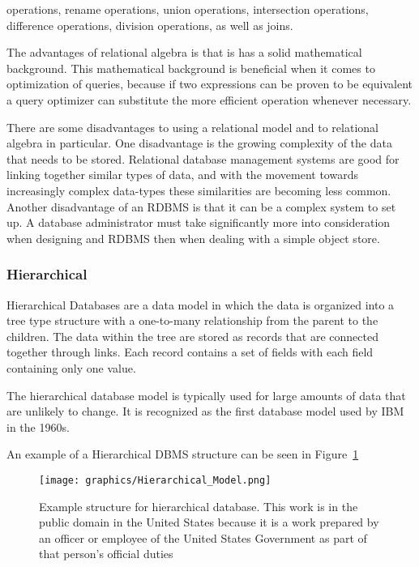 \documentclass[letterpaper, 12pt]{article}
\begin{document}
operations, rename operations, union operations, intersection operations, difference
operations, division operations, as well as joins.
\par\vspace{\baselineskip}
The advantages of relational algebra is that is has a solid mathematical background.
This mathematical background is beneficial when it comes to optimization of queries,
because if two expressions can be proven to be equivalent a query optimizer can
substitute the more efficient operation whenever necessary.
\par\vspace{\baselineskip}
There are some disadvantages to using a relational model and to relational algebra in
particular. One disadvantage is the growing complexity of the data that needs to be
stored. Relational database management systems are good for linking together similar types
of data, and with the movement towards increasingly complex data-types these similarities
are becoming less common. Another disadvantage of an RDBMS is that it can be a complex
system to set up. A database administrator must take significantly more into consideration
when designing and RDBMS then when dealing with a simple object store.

\subsubsection{Hierarchical}
Hierarchical Databases are a data model in which the data is organized into a tree type
structure with a one-to-many relationship from the parent to the children. The data
within the tree are stored as records that are connected together through links. Each
record contains a set of fields with each field containing only one value.
\par\vspace{\baselineskip}
The hierarchical database model is typically used for large amounts of data that are
unlikely to change. It is recognized as the first database model used by IBM in
the 1960s.\cite{hierarchical_dbms_techopedia}
\par\vspace{\baselineskip}

An example of a Hierarchical DBMS structure can be seen in Figure~\ref{fig:hierarchicalDBMS_structure}
\begin{figure}
  \centering
  \label{fig:hierarchicalDBMS_structure}
  \texttt{[image: graphics/Hierarchical\_Model.png]}
  \caption{Example structure for hierarchical database. This work is in the public domain in the United States because it is a work prepared by an officer or employee of the United States Government as part of that person’s official duties \cite{wikiHierarchicalDBMS}}
\end{figure}
\end{document}
